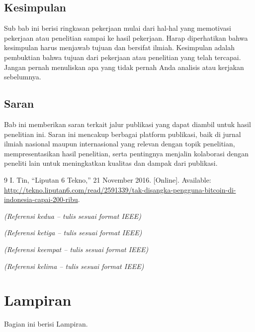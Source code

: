 \documentclass[a4paper,11pt,oneside]{report}
\begin{document}
\section{Kesimpulan}
Sub bab ini berisi ringkasan pekerjaan mulai dari hal-hal yang memotivasi
pekerjaan atau penelitian sampai ke hasil pekerjaan. Harap diperhatikan bahwa
kesimpulan harus menjawab tujuan dan bersifat ilmiah. Kesimpulan adalah
pembuktian bahwa tujuan dari pekerjaan atau penelitian yang telah tercapai.
Jangan pernah menuliskan apa yang tidak pernah Anda analisis atau kerjakan
sebelumnya.

\section{Saran}
Bab ini memberikan saran terkait jalur publikasi yang dapat diambil untuk hasil
penelitian ini. Saran ini mencakup berbagai platform publikasi, baik di jurnal
ilmiah nasional maupun internasional yang relevan dengan topik penelitian,
mempresentasikan hasil penelitian, serta pentingnya menjalin kolaborasi dengan
peneliti lain untuk meningkatkan kualitas dan dampak dari publikasi.

\renewcommand{\bibname}{Daftar Pustaka}
\begin{thebibliography}{9}
I. Tin, ``Liputan 6 Tekno,'' 21 November 2016. [Online]. Available:
\url{http://tekno.liputan6.com/read/2591339/tak-disangka-pengguna-bitcoin-di-indonesia-capai-200-ribu}.

\textit{(Referensi kedua -- tulis sesuai format IEEE)}

\textit{(Referensi ketiga -- tulis sesuai format IEEE)}

\textit{(Referensi keempat -- tulis sesuai format IEEE)}

\textit{(Referensi kelima -- tulis sesuai format IEEE)}
\end{thebibliography}

\appendix
\chapter*{Lampiran}
Bagian ini berisi Lampiran.
\end{document}

